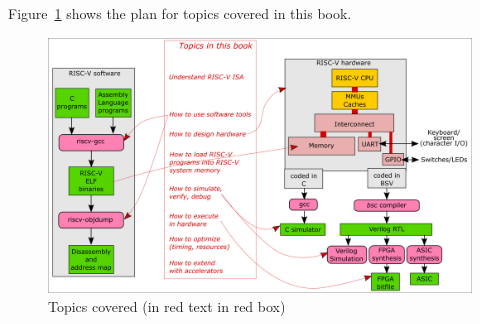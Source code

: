 Figure~\ref{fig_Topics} shows the plan for topics covered in this book.
\begin{figure}[htbp]
  \centerline{\includegraphics[width=6in,angle=0]{Figures/fig_Topics}}
  \caption{\label{fig_Topics}Topics covered (in red text in red box)}
\end{figure}

